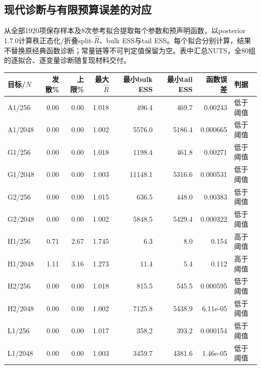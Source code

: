 \subsection{现代诊断与有限预算误差的对应}
从全部1920项保存样本及8次参考拟合提取每个参数和预声明函数，以posterior 1.7.0计算秩正态化/折叠split-$\hat R$、bulk ESS与tail ESS\cite{posterior}。每个拟合分别计算，结果不替换原经典函数诊断；常量链等不可判定值保留为空。表中汇总NUTS，全80组的逐拟合、逐变量诊断随复现材料交付。

\begin{table}[htbp]\centering\scriptsize
\begin{tabular}{lrrrrrrl}\toprule
目标/$N$ & 发散\% & 上限\% & 最大$\hat R$ & 最小bulk ESS & 最小tail ESS & 函数误差 & 判据\\\midrule

A1/256 & 0.00 & 0.00 & 1.018 & 496.4 & 469.7 & 0.00243 & 低于阈值\\

A1/2048 & 0.00 & 0.00 & 1.002 & 5576.0 & 5186.4 & 0.000665 & 低于阈值\\

G1/256 & 0.00 & 0.00 & 1.018 & 1198.4 & 461.8 & 0.00271 & 低于阈值\\

G1/2048 & 0.00 & 0.00 & 1.003 & 11148.1 & 5316.6 & 0.000531 & 低于阈值\\

G2/256 & 0.00 & 0.00 & 1.015 & 636.5 & 448.0 & 0.00383 & 低于阈值\\

G2/2048 & 0.00 & 0.00 & 1.002 & 5848.5 & 5429.4 & 0.000322 & 低于阈值\\

H1/256 & 0.71 & 2.67 & 1.745 & 6.3 & 8.0 & 0.154 & 高于阈值\\

H1/2048 & 1.11 & 3.16 & 1.273 & 11.4 & 5.4 & 0.112 & 高于阈值\\

H2/256 & 0.00 & 0.00 & 1.018 & 815.5 & 545.5 & 0.000595 & 低于阈值\\

H2/2048 & 0.00 & 0.00 & 1.002 & 7125.8 & 5438.9 & 6.11e-05 & 低于阈值\\

L1/256 & 0.00 & 0.00 & 1.017 & 358.2 & 393.2 & 0.000154 & 低于阈值\\

L1/2048 & 0.00 & 0.00 & 1.003 & 3459.7 & 4381.6 & 1.46e-05 & 低于阈值\\


\end{tabular}
\end{table}
